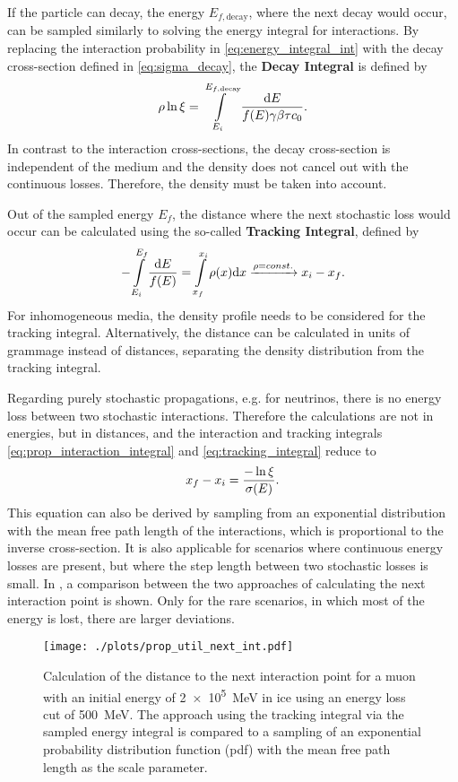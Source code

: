If the particle can decay, the energy $E_{f,\text{decay}}$, where the next decay would occur, can be sampled similarly to solving the energy integral for interactions.
By replacing the interaction probability in \eqref{eq:energy_integral_int} with the decay cross-section defined in \eqref{eq:sigma_decay}, the \textbf{Decay Integral} is defined by
\begin{align}
    \rho \operatorname{ln} \xi = \int\limits_{E_i}^{E_{f,\text{decay}}} \frac{\mathrm{d} E}{f(E) \gamma\beta \tau c_0} .
\end{align}
In contrast to the interaction cross-sections, the decay cross-section is independent of the medium and the density does not cancel out with the continuous losses.
Therefore, the density must be taken into account.

Out of the sampled energy $E_f$, the distance where the next stochastic loss would occur can be calculated using the so-called \textbf{Tracking Integral}, defined by
\begin{align} \label{eq:tracking_integral}
    - \int\limits_{E_i}^{E_f} \frac{\mathrm{d} E}{f(E)}
    = \int\limits_{x_f}^{x_i} \rho(x) \mathrm{d} x
    \xrightarrow{\rho=const.}
    x_i - x_f .
\end{align}
For inhomogeneous media, the density profile needs to be considered for the tracking integral.
Alternatively, the distance can be calculated in units of grammage instead of distances, separating the density distribution from the tracking integral.

Regarding purely stochastic propagations, e.g. for neutrinos, there is no energy loss between two stochastic interactions.
Therefore the calculations are not in energies, but in distances, and the interaction and tracking integrals \eqref{eq:prop_interaction_integral} and \eqref{eq:tracking_integral} reduce to
\begin{align} \label{eq:tracking_stochastic}
    x_f - x_i = \frac{- \operatorname{ln} \xi}{\sigma(E)} .
\end{align}
This equation can also be derived by sampling from an exponential distribution with the mean free path length of the interactions, which is proportional to the inverse cross-section.
It is also applicable for scenarios where continuous energy losses are present, but where the step length between two stochastic losses is small.
In , a comparison between the two approaches of calculating the next interaction point is shown.
Only for the rare scenarios, in which most of the energy is lost, there are larger deviations.
\begin{figure}
    \centering
    \texttt{[image: ./plots/prop\_util\_next\_int.pdf]}
    \caption{Calculation of the distance to the next interaction point for a muon with an initial energy of \SI{2e5}{MeV} in ice using an energy loss cut of \SI{500}{MeV}. The approach using the tracking integral via the sampled energy integral is compared to a sampling of an exponential probability distribution function (pdf) with the mean free path length as the scale parameter.}
    \label{fig:prop_util_tracking}
\end{figure}

